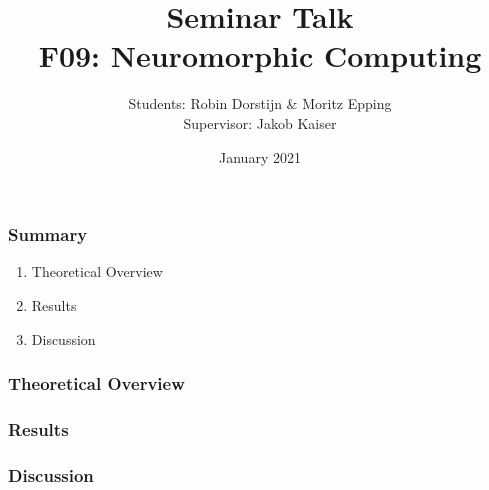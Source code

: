 \documentclass{beamer}
\title{Seminar Talk \\ F09: Neuromorphic Computing}
\author{Students: Robin Dorstijn \& Moritz Epping \\ Supervisor: Jakob Kaiser}
\institute{Universität Heidelberg}
\date{January 2021}
\begin{document}
\frame{\titlepage}

\begin{frame}
    \frametitle{Summary}
    \begin{enumerate}
        \item Theoretical Overview
        \item Results
        \item Discussion
    \end{enumerate}
\end{frame}

\begin{frame}
    \frametitle{Theoretical Overview}
\end{frame}

\begin{frame}
    \frametitle{Results}
\end{frame}

\begin{frame}
    \frametitle{Discussion}
\end{frame}
\end{document}
